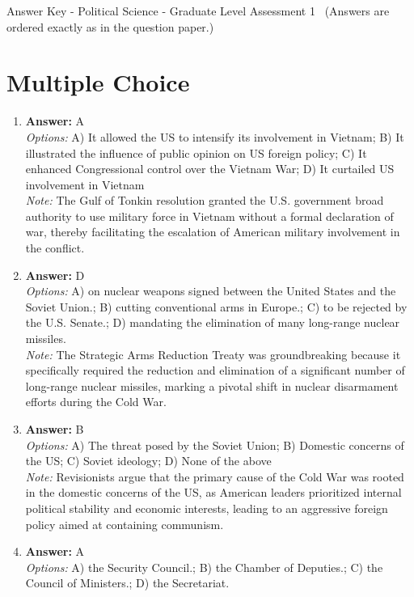 \documentclass[12pt]{article}
\begin{document}
\begin{center}
Answer Key - Political Science - Graduate Level Assessment 1 \
\small (Answers are ordered exactly as in the question paper.)
\end{center}

\section*{Multiple Choice}
\begin{enumerate}[label=\arabic*.]
\item \textbf{Answer:} A
\\ \textit{Options:} A) It allowed the US to intensify its involvement in Vietnam; B) It illustrated the influence of public opinion on US foreign policy; C) It enhanced Congressional control over the Vietnam War; D) It curtailed US involvement in Vietnam
\\ \textit{Note:} The Gulf of Tonkin resolution granted the U.S. government broad authority to use military force in Vietnam without a formal declaration of war, thereby facilitating the escalation of American military involvement in the conflict.
\item \textbf{Answer:} D
\\ \textit{Options:} A) on nuclear weapons signed between the United States and the Soviet Union.; B) cutting conventional arms in Europe.; C) to be rejected by the U.S. Senate.; D) mandating the elimination of many long-range nuclear missiles.
\\ \textit{Note:} The Strategic Arms Reduction Treaty was groundbreaking because it specifically required the reduction and elimination of a significant number of long-range nuclear missiles, marking a pivotal shift in nuclear disarmament efforts during the Cold War.
\item \textbf{Answer:} B
\\ \textit{Options:} A) The threat posed by the Soviet Union; B) Domestic concerns of the US; C) Soviet ideology; D) None of the above
\\ \textit{Note:} Revisionists argue that the primary cause of the Cold War was rooted in the domestic concerns of the US, as American leaders prioritized internal political stability and economic interests, leading to an aggressive foreign policy aimed at containing communism.
\item \textbf{Answer:} A
\\ \textit{Options:} A) the Security Council.; B) the Chamber of Deputies.; C) the Council of Ministers.; D) the Secretariat.

\end{enumerate}
\end{document}
